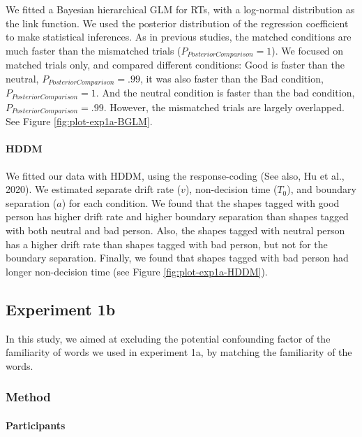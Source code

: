\documentclass[
  english,
  man]{apa6}
\let\oldparagraph\paragraph
\renewcommand{\paragraph}[1]{\oldparagraph{#1}\mbox{}}
\begin{document}
We fitted a Bayesian hierarchical GLM for RTs, with a log-normal distribution as the link function. We used the posterior distribution of the regression coefficient to make statistical inferences. As in previous studies, the matched conditions are much faster than the mismatched trials (\(P_{PosteriorComparison} = 1\)). We focused on matched trials only, and compared different conditions: Good is faster than the neutral, \(P_{PosteriorComparison} = .99\), it was also faster than the Bad condition, \(P_{PosteriorComparison} = 1\). And the neutral condition is faster than the bad condition, \(P_{PosteriorComparison} = .99\). However, the mismatched trials are largely overlapped. See Figure \ref{fig:plot-exp1a-BGLM}.

\hypertarget{hddm}{%
\paragraph{HDDM}\label{hddm}}

We fitted our data with HDDM, using the response-coding (See also, Hu et al., 2020). We estimated separate drift rate (\(v\)), non-decision time (\(T_{0}\)), and boundary separation (\(a\)) for each condition. We found that the shapes tagged with good person has higher drift rate and higher boundary separation than shapes tagged with both neutral and bad person. Also, the shapes tagged with neutral person has a higher drift rate than shapes tagged with bad person, but not for the boundary separation. Finally, we found that shapes tagged with bad person had longer non-decision time (see Figure \ref{fig:plot-exp1a-HDDM}).

\hypertarget{experiment-1b}{%
\subsection{Experiment 1b}\label{experiment-1b}}

In this study, we aimed at excluding the potential confounding factor of the familiarity of words we used in experiment 1a, by matching the familiarity of the words.

\hypertarget{method}{%
\subsubsection{Method}\label{method}}

\hypertarget{participants-1}{%
\paragraph{Participants}\label{participants-1}}
\end{document}
